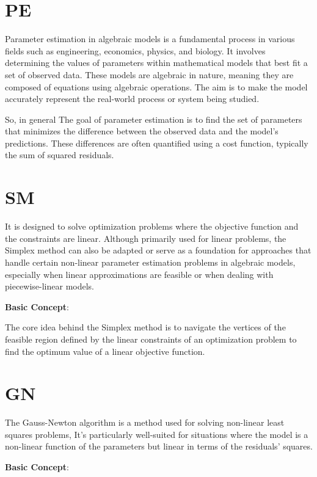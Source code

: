 \documentclass[a4paper,11pt]{article} %
\begin{document}
\setlength{\parskip}{1em} 
\setlength{\parindent}{0pt}

\section*{PE}

Parameter estimation in algebraic models is a fundamental process in various fields such as engineering,
economics, physics, and biology. It involves determining the values of parameters within mathematical 
models that best fit a set of observed data. These models are algebraic in nature, meaning they are 
composed of equations using algebraic operations. The aim is to make the model accurately represent 
the real-world process or system being studied.

So, in general The goal of parameter estimation is to find the set of parameters 
that minimizes the difference between the observed data and the model's 
predictions. These differences are often quantified using a cost function, 
typically the sum of squared residuals.

\section*{SM}
It is designed to solve optimization problems where the objective function and the constraints are 
linear. Although primarily used for linear problems, the Simplex method can also be adapted or serve 
as a foundation for approaches that handle certain non-linear parameter estimation problems in 
algebraic models, especially when linear approximations are feasible or when dealing with piecewise-linear
models.

\textbf{Basic Concept}:

The core idea behind the Simplex method is to navigate the vertices of the feasible region defined by the linear 
constraints of an optimization problem to find the optimum value of a linear objective function.

\section*{GN}

The Gauss-Newton algorithm is a method used for solving non-linear least squares problems,
It's particularly well-suited for situations where the model is a non-linear function of the
parameters but linear in terms of the residuals' squares. 

\textbf{Basic Concept}:
\end{document}
